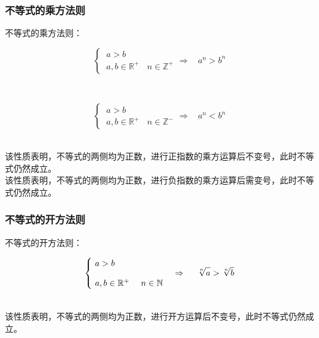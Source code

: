 \documentclass[UTF8]{ctexart}
\begin{document}
\newpage

\subsubsection{不等式的乘方法则}
    不等式的乘方法则：
    \begin{large}
        \begin{equation*}
            \begin{cases}
                ~a>b\\[3mm]
                ~a,b\in\mathbb{R^+}~~~~n\in\mathbb{Z^+}
            \end{cases}
            \Rightarrow~~~~a^n>b^n
        \end{equation*}
    \end{large}\\
    \begin{large}
        \begin{equation*}
            \begin{cases}
                ~a>b\\[3mm]
                ~a,b\in\mathbb{R^+}~~~~n\in\mathbb{Z^-}
            \end{cases}
            \Rightarrow~~~~a^n<b^n
        \end{equation*}
    \end{large}\\[1mm]
    该性质表明，不等式的两侧均为正数，进行正指数的乘方运算后不变号，此时不等式仍然成立。\\[3mm]
    该性质表明，不等式的两侧均为正数，进行负指数的乘方运算后需变号，此时不等式仍然成立。\\

\subsubsection{不等式的开方法则}
    不等式的开方法则：
    \begin{large}
        \begin{equation*}
            \begin{cases}
                ~a>b\\[3mm]
                ~a,b\in\mathbb{R^+}~~~~n\in\mathbb{N}
            \end{cases}
            \Rightarrow~~~~\sqrt[n]{\vphantom{b}a}>\sqrt[n]{b}
        \end{equation*}
    \end{large}\\[1mm]
    该性质表明，不等式的两侧均为正数，进行开方运算后不变号，此时不等式仍然成立。\\
\end{document}

